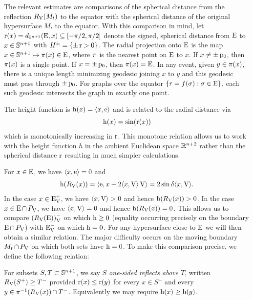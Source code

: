 \documentclass{amsart}
\begin{document}
The relevant estimates are comparisons of the spherical distance from the reflection \(\reflectionmap(M_t)\) to the equator with the spherical distance of the original hypersurface \(M_t\) to the equator. With this comparison in mind, let \(\radialdistance(x) = d_{\S^{n+1}} (\equator, x) \subseteq [-\pi/2,\pi/2]\) denote the signed, spherical distance from \(\equator\) to \(x \in \S^{n+1}\) with \(H^{\pm} = \{\pm \radialdistance > 0\}\). The radial projection onto \(\equator\) is the map \(x \in \S^{n+1} \mapsto \radialprojection(x) \in \equator\), where \(\radialprojection\) is the nearest point on \(\equator\) to \(x\). If \(x \ne \pm \basepoint\), then \(\radialprojection(x)\) is a single point. If \(x = \pm \basepoint\), then \(\radialprojection(x) = \equator\). In any event, given \(y \in \radialprojection(x)\), there is a unique length minimizing geodesic joining \(x\) to \(y\) and this geodesic must pass through \(\pm \basepoint\). For graphs over the equator \(\{r = f(\sigma) : \sigma \in \equator\}\), each such geodesic intersects the graph in exactly one point.

The height function is \(\height(x) = \ip{x}{\vertvec}\) and is related to the radial distance via
\[
\height(x) = \sin(\radialdistance(x))
\]
which is monotonically increasing in \(\radialdistance\). This monotone relation allows us to work with the height function \(h\) in the ambient Euclidean space \(\R^{n+2}\) rather than the spherical distance \(\radialdistance\) resulting in much simpler calculations.

For \(x \in \equator\), we have \(\ip{x}{\vertvec} = 0\) and
\begin{equation}
\label{eq:equatorheight}
\height(\reflectionmap(x)) = \ip{\vertvec}{x - 2 \ip{x}{\reflectionvector} \reflectionvector} = 2 \sin\reflectionangle \ip{x}{\reflectionvector}.
\end{equation}
In the case \(x \in \reflectionset{\equator}^+\), we have \(\ip{x}{\reflectionvector} > 0\) and hence \(\height(\reflectionmap(x)) > 0\). In the case \(x \in \equator \intersect \reflectionplane\), we have \(\ip{x}{\reflectionvector} = 0\) and hence \(\height(\reflectionmap(x)) = 0\). This allows us to compare \(\reflectionset{(\reflectionmap(\equator))}^-\) on which \(\height\geq 0\) (equality occurring precisely on the boundary \(\equator \intersect \reflectionplane\)) with \(\reflectionset{\equator}^-\) on which \(\height = 0\). For any hypersurface close to \(\equator\) we will then obtain a similar relation. The major difficulty occurs on the moving boundary \(M_t \intersect \reflectionplane\) on which both sets have \(\height = 0\). To make this comparison precise, we define the following relation:
\begin{definition}
For subsets \(S,T \subset \S^{n+1}\), we say \emph{\(S\) one-sided reflects above \(T\)}, written \(\reflectionmap(S^+) \geq T^-\) provided \(\radialdistance(x) \leq \radialdistance(y)\) for every \(x \in S^+\) and every \(y \in \radialprojection^{-1} (\reflectionmap(x)) \intersect T^-\). Equivalently we may require \(\height(x) \geq \height(y)\).
\end{definition}
\end{document}
